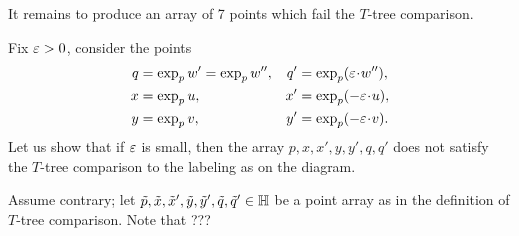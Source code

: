 \begin{wrapfigure}{r}{26 mm}
\end{wrapfigure}

It remains to produce an array of 7 points which fail the $T$-tree comparison.

Fix $\varepsilon>0$, consider the points
\begin{align*}
q&=\exp_pw'=\exp_pw'',
&
q'&=\exp_p(\eps\cdot w''),
\\
x&=\exp_p u,
&
x'&=\exp_p (-\eps\cdot u),
\\
y&=\exp_p v,
&
y'&=\exp_p (-\eps\cdot v).
\end{align*}
Let us show that if $\varepsilon$ is small, then the array $p,x,x',y,y',q,q'$ does not satisfy the $T$-tree comparison to the labeling as on the diagram.

Assume contrary; let $\tilde p,\tilde x,\tilde x',\tilde y,\tilde y',\tilde q,\tilde q'\in\mathbb{H}$ be a point array as in the definition of $T$-tree comparison.
Note that ???
\qeds





